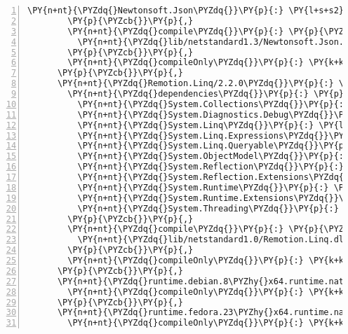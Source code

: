 \begin{Verbatim}[commandchars=\\\{\},numbers=left,firstnumber=1,stepnumber=1,numberblanklines=0]
          \PY{n+nt}{\PYZdq{}Newtonsoft.Json\PYZdq{}}\PY{p}{:} \PY{l+s+s2}{\PYZdq{}11.0.2\PYZdq{}}
        \PY{p}{\PYZcb{}}\PY{p}{,}
        \PY{n+nt}{\PYZdq{}compile\PYZdq{}}\PY{p}{:} \PY{p}{\PYZob{}}
          \PY{n+nt}{\PYZdq{}lib/netstandard1.3/Newtonsoft.Json.Bson.dll\PYZdq{}}\PY{p}{:} \PY{p}{\PYZob{}}\PY{p}{\PYZcb{}}
        \PY{p}{\PYZcb{}}\PY{p}{,}
        \PY{n+nt}{\PYZdq{}compileOnly\PYZdq{}}\PY{p}{:} \PY{k+kc}{true}
      \PY{p}{\PYZcb{}}\PY{p}{,}
      \PY{n+nt}{\PYZdq{}Remotion.Linq/2.2.0\PYZdq{}}\PY{p}{:} \PY{p}{\PYZob{}}
        \PY{n+nt}{\PYZdq{}dependencies\PYZdq{}}\PY{p}{:} \PY{p}{\PYZob{}}
          \PY{n+nt}{\PYZdq{}System.Collections\PYZdq{}}\PY{p}{:} \PY{l+s+s2}{\PYZdq{}4.3.0\PYZdq{}}\PY{p}{,}
          \PY{n+nt}{\PYZdq{}System.Diagnostics.Debug\PYZdq{}}\PY{p}{:} \PY{l+s+s2}{\PYZdq{}4.3.0\PYZdq{}}\PY{p}{,}
          \PY{n+nt}{\PYZdq{}System.Linq\PYZdq{}}\PY{p}{:} \PY{l+s+s2}{\PYZdq{}4.3.0\PYZdq{}}\PY{p}{,}
          \PY{n+nt}{\PYZdq{}System.Linq.Expressions\PYZdq{}}\PY{p}{:} \PY{l+s+s2}{\PYZdq{}4.3.0\PYZdq{}}\PY{p}{,}
          \PY{n+nt}{\PYZdq{}System.Linq.Queryable\PYZdq{}}\PY{p}{:} \PY{l+s+s2}{\PYZdq{}4.0.1\PYZdq{}}\PY{p}{,}
          \PY{n+nt}{\PYZdq{}System.ObjectModel\PYZdq{}}\PY{p}{:} \PY{l+s+s2}{\PYZdq{}4.3.0\PYZdq{}}\PY{p}{,}
          \PY{n+nt}{\PYZdq{}System.Reflection\PYZdq{}}\PY{p}{:} \PY{l+s+s2}{\PYZdq{}4.3.0\PYZdq{}}\PY{p}{,}
          \PY{n+nt}{\PYZdq{}System.Reflection.Extensions\PYZdq{}}\PY{p}{:} \PY{l+s+s2}{\PYZdq{}4.3.0\PYZdq{}}\PY{p}{,}
          \PY{n+nt}{\PYZdq{}System.Runtime\PYZdq{}}\PY{p}{:} \PY{l+s+s2}{\PYZdq{}4.3.0\PYZdq{}}\PY{p}{,}
          \PY{n+nt}{\PYZdq{}System.Runtime.Extensions\PYZdq{}}\PY{p}{:} \PY{l+s+s2}{\PYZdq{}4.3.0\PYZdq{}}\PY{p}{,}
          \PY{n+nt}{\PYZdq{}System.Threading\PYZdq{}}\PY{p}{:} \PY{l+s+s2}{\PYZdq{}4.3.0\PYZdq{}}
        \PY{p}{\PYZcb{}}\PY{p}{,}
        \PY{n+nt}{\PYZdq{}compile\PYZdq{}}\PY{p}{:} \PY{p}{\PYZob{}}
          \PY{n+nt}{\PYZdq{}lib/netstandard1.0/Remotion.Linq.dll\PYZdq{}}\PY{p}{:} \PY{p}{\PYZob{}}\PY{p}{\PYZcb{}}
        \PY{p}{\PYZcb{}}\PY{p}{,}
        \PY{n+nt}{\PYZdq{}compileOnly\PYZdq{}}\PY{p}{:} \PY{k+kc}{true}
      \PY{p}{\PYZcb{}}\PY{p}{,}
      \PY{n+nt}{\PYZdq{}runtime.debian.8\PYZhy{}x64.runtime.native.System.Security.Cryptography.OpenSsl/4.3.0\PYZdq{}}\PY{p}{:} \PY{p}{\PYZob{}}
        \PY{n+nt}{\PYZdq{}compileOnly\PYZdq{}}\PY{p}{:} \PY{k+kc}{true}
      \PY{p}{\PYZcb{}}\PY{p}{,}
      \PY{n+nt}{\PYZdq{}runtime.fedora.23\PYZhy{}x64.runtime.native.System.Security.Cryptography.OpenSsl/4.3.0\PYZdq{}}\PY{p}{:} \PY{p}{\PYZob{}}
        \PY{n+nt}{\PYZdq{}compileOnly\PYZdq{}}\PY{p}{:} \PY{k+kc}{true}

\end{Verbatim}
